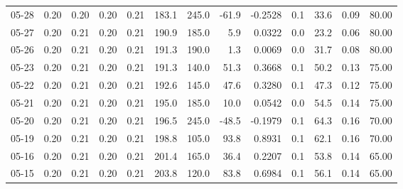 \begin{threeparttable}
{\begin{tabular}{lrrrrrrrrrrrr}
  05-28 &          0.20 &          0.20 &          0.20 &        0.21 &               183.1 &               245.0 &      -61.9 &      -0.2528 &                 0.1 &             33.6 &            0.09 &                  80.00 \\
  05-27 &          0.20 &          0.21 &          0.20 &        0.21 &               190.9 &               185.0 &        5.9 &       0.0322 &                 0.0 &             23.2 &            0.06 &                  80.00 \\
  05-26 &          0.20 &          0.21 &          0.20 &        0.21 &               191.3 &               190.0 &        1.3 &       0.0069 &                 0.0 &             31.7 &            0.08 &                  80.00 \\
  05-23 &          0.20 &          0.21 &          0.20 &        0.21 &               191.3 &               140.0 &       51.3 &       0.3668 &                 0.1 &             50.2 &            0.13 &                  75.00 \\
  05-22 &          0.20 &          0.21 &          0.20 &        0.21 &               192.6 &               145.0 &       47.6 &       0.3280 &                 0.1 &             47.3 &            0.12 &                  75.00 \\
  05-21 &          0.20 &          0.21 &          0.20 &        0.21 &               195.0 &               185.0 &       10.0 &       0.0542 &                 0.0 &             54.5 &            0.14 &                  75.00 \\
  05-20 &          0.20 &          0.21 &          0.20 &        0.21 &               196.5 &               245.0 &      -48.5 &      -0.1979 &                 0.1 &             64.3 &            0.16 &                  70.00 \\
  05-19 &          0.20 &          0.21 &          0.20 &        0.21 &               198.8 &               105.0 &       93.8 &       0.8931 &                 0.1 &             62.1 &            0.16 &                  70.00 \\
  05-16 &          0.20 &          0.21 &          0.20 &        0.21 &               201.4 &               165.0 &       36.4 &       0.2207 &                 0.1 &             53.8 &            0.14 &                  65.00 \\
  05-15 &          0.20 &          0.21 &          0.20 &        0.21 &               203.8 &               120.0 &       83.8 &       0.6984 &                 0.1 &             56.1 &            0.14 &                  65.00 \\

\end{tabular}}
\end{threeparttable}
